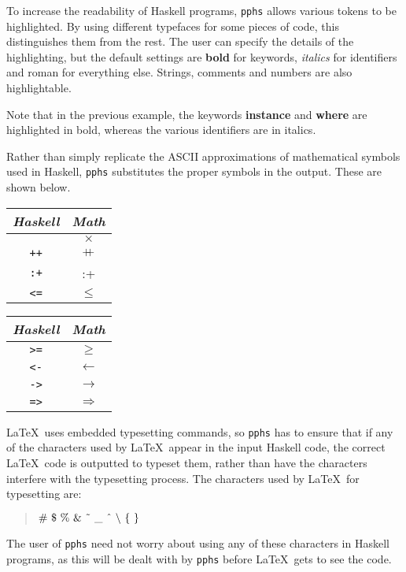 
To increase the readability of Haskell programs, {\tt pphs} allows various tokens
to be highlighted.  By using different typefaces for some pieces of code, this
distinguishes them from the rest.  The user can specify the details of
the highlighting, but the default settings are {\bf bold} for
keywords, {\it italics} for identifiers and {\rm roman} for everything else.
Strings, comments and numbers are also highlightable.

Note that in the previous example, the keywords {\bf instance} and {\bf where}
are highlighted in bold, whereas the various identifiers are in italics.


Rather than simply replicate the ASCII approximations of mathematical symbols
used in Haskell, {\tt pphs}
substitutes the proper symbols in the output.  These are shown below.
\begin{center}
\begin{tabular}[t]{|c|c|} \hline
{\em Haskell\/} & {\em Math\/} \\ \hline
{\tt *} & $\times$ \\
{\tt ++} & {\hbox{$+\mkern-7.5mu+$}} \\
{\tt :+} & {:}{+} \\
{\tt <=} & $\leq$ \\ \hline
\end{tabular} \hskip3mm \begin{tabular}[t]{|c|c|} \hline
{\em Haskell\/} & {\em Math\/} \\ \hline
{\tt >=} & $\geq$ \\
{\tt <-} & $\leftarrow$ \\
{\tt ->} & $\rightarrow$ \\
{\tt =>} & $\Rightarrow$ \\ \hline
\end{tabular}
\end{center}


\LaTeX\ uses embedded typesetting commands, so {\tt pphs} has to ensure that if
any of the characters used by \LaTeX\ appear in the input Haskell code, the correct
\LaTeX\ code is outputted to typeset them, rather than have the characters interfere
with the typesetting process.  The characters used by \LaTeX\ for typesetting are:
\begin{quote}
\(\#\ \$\ \%\ \&\ \char'176\ \_\ \char'136\ \hbox{$\setminus$}\ \hbox{$\cal \char'146\ \char'147$}\)
\end{quote}
The user of {\tt pphs} need not worry about using any of these characters in Haskell
programs, as this will be dealt with by {\tt pphs} before \LaTeX\ gets to see the code.

